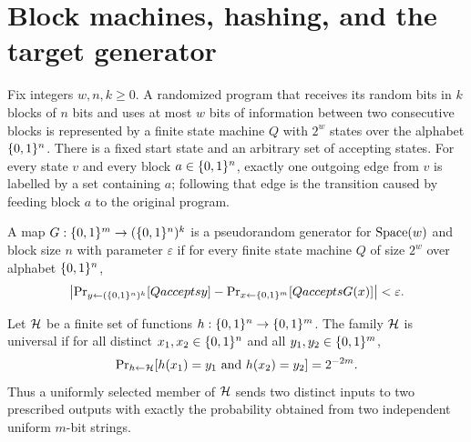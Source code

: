 %

\chapter{Block machines, hashing, and the target generator}

\begin{definition}
  \label{def:block-fsm}
  Fix integers $w,n,k \ge 0$. A randomized program that receives its random
  bits in $k$ blocks of $n$ bits and uses at most $w$ bits of information
  between two consecutive blocks is represented by a finite state machine
  $Q$ with $2^w$ states over the alphabet $\{0,1\}^n$. There is a fixed start
  state and an arbitrary set of accepting states. For every state $v$ and
  every block $a \in \{0,1\}^n$, exactly one outgoing edge from $v$ is labelled
  by a set containing $a$; following that edge is the transition caused by
  feeding block $a$ to the original program.
\end{definition}

\begin{definition}
  \label{def:block-prg}
  A map $G:\{0,1\}^m \to (\{0,1\}^n)^k$ is a pseudorandom generator for
  $\operatorname{Space}(w)$ and block size $n$ with parameter $\varepsilon$ if for every
  finite state machine $Q$ of size $2^w$ over alphabet $\{0,1\}^n$,
  \[
    \left|\operatorname{Pr}_{y \leftarrow (\{0,1\}^n)^k}[Q accepts y]
    - \operatorname{Pr}_{x \leftarrow \{0,1\}^m}[Q accepts G(x)]\right| < \varepsilon .
  \]
\end{definition}

\begin{definition}
  \label{def:universal-family}
  Let $\mathcal{H}$ be a finite set of functions $h:\{0,1\}^n \to \{0,1\}^m$. The family
  $\mathcal{H}$ is universal if for all distinct $x_1,x_2 \in \{0,1\}^n$ and all
  $y_1,y_2 \in \{0,1\}^m$,
  \[
    \operatorname{Pr}_{h \leftarrow \mathcal{H}}[h(x_1)=y_1 \text{ and } h(x_2)=y_2]=2^{-2m}.
  \]
  Thus a uniformly selected member of $\mathcal{H}$ sends two distinct inputs to two
  prescribed outputs with exactly the probability obtained from two independent
  uniform $m$-bit strings.
\end{definition}

